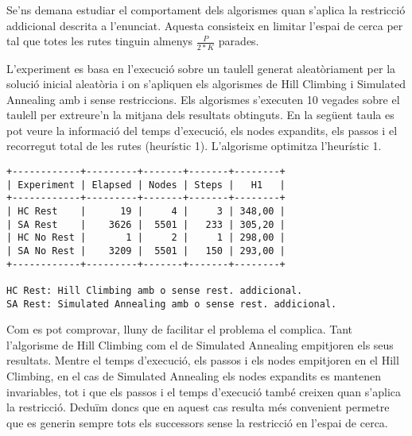 
Se'ns demana estudiar el comportament dels algorismes quan s'aplica la restricció addicional descrita a l'enunciat. Aquesta consisteix en limitar l'espai de cerca per tal que totes les rutes tinguin almenys $\frac{P}{2*K}$ parades.

L'experiment es basa en l'execució sobre un taulell generat aleatòriament per la solució inicial aleatòria i on s'apliquen els algorismes de Hill Climbing i Simulated Annealing amb i sense restriccions. Els algorismes s'executen 10 vegades sobre el taulell per extreure'n la mitjana dels resultats obtinguts. En la següent taula es pot veure la informació del temps d'execució, els nodes expandits, els passos i el recorregut total de les rutes (heurístic 1). L'algorisme optimitza l'heurístic 1.

\begin{verbatim}
+------------+---------+-------+-------+--------+
| Experiment | Elapsed | Nodes | Steps |   H1   |
+------------+---------+-------+-------+--------+
| HC Rest    |      19 |     4 |     3 | 348,00 |
| SA Rest    |    3626 |  5501 |   233 | 305,20 |
| HC No Rest |       1 |     2 |     1 | 298,00 |
| SA No Rest |    3209 |  5501 |   150 | 293,00 |
+------------+---------+-------+-------+--------+
                                               
HC Rest: Hill Climbing amb o sense rest. addicional.
SA Rest: Simulated Annealing amb o sense rest. addicional.
\end{verbatim}  

Com es pot comprovar, lluny de facilitar el problema el complica. Tant l'algorisme de Hill Climbing com el de Simulated Annealing empitjoren els seus resultats. Mentre el temps d'execució, els passos i els nodes empitjoren en el Hill Climbing, en el cas de Simulated Annealing els nodes expandits es mantenen invariables, tot i que els passos i el temps d'execució també creixen quan s'aplica la restricció. Deduïm doncs que en aquest cas resulta més convenient permetre que es generin sempre tots els successors sense la restricció en l'espai de cerca.
